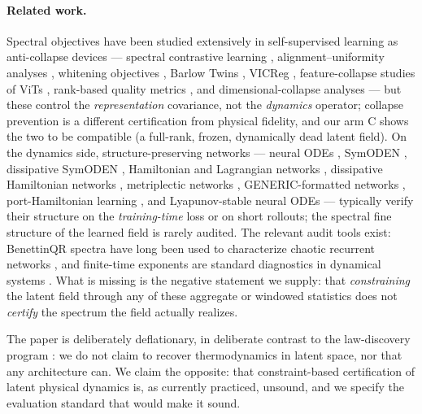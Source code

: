 \documentclass[journal]{IEEEtran}
\begin{document}
\paragraph{Related work.}
Spectral objectives have been studied extensively in self-supervised
learning as anti-collapse devices --- spectral contrastive learning
\cite{haochen2021spectral}, alignment--uniformity analyses
\cite{wang2020understanding}, whitening objectives
\cite{ermolov2021whitening}, Barlow Twins \cite{zbontar2021barlow}, VICReg
\cite{bardes2022vicreg}, feature-collapse studies of ViTs
\cite{caron2021emerging}, rank-based quality metrics
\cite{garrido2023rankme}, and dimensional-collapse analyses
\cite{jing2022dimensional} --- but these control the \emph{representation}
covariance, not the \emph{dynamics} operator; collapse prevention is a
different certification from physical fidelity, and our arm C shows the
two to be compatible (a full-rank, frozen, dynamically dead latent
field). On the dynamics side, structure-preserving networks --- neural
ODEs \cite{chen2018neural}, SymODEN \cite{zhong2020symoden}, dissipative
SymODEN \cite{zhong2021dissipative}, Hamiltonian and Lagrangian networks
\cite{greydanus2019hamiltonian,cranmer2020lagrangian,toth2020hamiltonian,lutter2019deep},
dissipative Hamiltonian networks \cite{sosanya2022dissipative},
metriplectic networks
\cite{hernandez2021metriplectic}, GENERIC-formatted networks
\cite{zhang2021generic}, port-Hamiltonian learning
\cite{van2020port}, and Lyapunov-stable neural ODEs
\cite{kolter2019lyapunov} --- typically verify their structure on the
\emph{training-time} loss or on short rollouts; the spectral fine
structure of the learned field is rarely audited. The relevant audit
tools exist: Benettin\textendash{}QR spectra have long been used to
characterize chaotic recurrent networks \cite{engelken2020lyapunov,vogt2022lyapunov},
and finite-time exponents are standard diagnostics in dynamical systems
\cite{haller2001distinguished}. What is missing is the negative
statement we supply: that \emph{constraining} the latent field through
any of these aggregate or windowed statistics does not \emph{certify}
the spectrum the field actually realizes.

The paper is deliberately deflationary, in deliberate contrast to the
law-discovery program \cite{brunton2016discovering,iten2020ai,karniadakis2021physics}:
we do not claim to recover thermodynamics in latent space, nor that any
architecture can. We claim the opposite: that constraint-based
certification of latent physical dynamics is, as currently practiced,
unsound, and we specify the evaluation standard that would make it sound.
\end{document}
